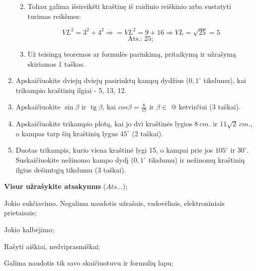 \documentclass[a4paper]{article}
\makeatletter
\DeclareMathOperator{\tg}{tg}
\newcommand*{\rom}[1]{\expandafter\@slowromancap\romannumeral #1@}
\makeatother
\begin{document}
\begin{enumerate}
\begin{enumerate}
\begin{minipage}{0.5\textwidth}
                        \end{minipage}

                  \item \parbox{0.7\textwidth}{
                              Toliau galima išsireikšti kraštinę iš
                              raidinio reiškinio arba sustatyti turimas
                              reikšmes:
                        }

                        $$VL^{2}=3^{2}+4^{2} \Rightarrow=
                              VL^{2}=9+16 \Rightarrow VL=\sqrt{25}=5$$
                        $$\text{Ats.:} \; 25;$$

                  \item Už teisingą teoremos ar formulės parinkimą,
                        pritaikymą
                        ir užrašymą skiriamas 1 taškas.
            \end{enumerate}

      \item Apskaičiuokite dviejų dviejų pasirinktų kampų dydžius ($0,1^\circ$
            tikslumu), kai trikampio kraštinių ilgiai - 5, 13, 12.

      \item Apskaičiuokite $\sin\beta$ ir $\tg \beta$, kai $cos \beta =
                  \frac{8}{17}$ ir $\beta \in$ \rom{4} ketvirčiui (3 taškai).

      \item Apskaičiuokite trikampio plotą, kai jo dvi kraštinės lygios
            $8\:cm.$ ir $11\sqrt{2}\:cm.$, o kampas tarp šių kraštinių lygus
            $45^\circ$ (2 taškai).

      \item Duotas trikampis, kurio viena kraštinė lygi 15, o kampai prie jos
            $105^\circ$ ir $30^\circ$. Suskaičiuokite nežinomo kampo dydį
            ($0,1^\circ$ tikslumu) ir
            nežinomų kraštinių ilgius dešimtųjų tikslumu (3 taškai).

\end{enumerate}

\begin{small}
      \begin{enumerate*}[label={(\arabic*)}]
            \item \textbf{Visur užrašykite atsakymus} ($Ats\ldots$);
            \item Jokio sukčiavimo. Negalima naudotis užrašais, vadovėliais,
            elektroniniais prietaisais;
            \item Jokio kalbėjimo;
            \item Rašyti aiškiai, nedviprasmiškai;
            \item Galima naudotis tik savo skaičiuotuvu ir formulių lapu;
      \end{enumerate*}
\end{small}
\end{document}
